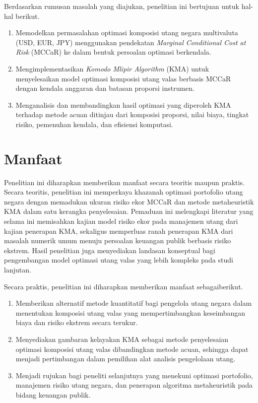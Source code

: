 Berdasarkan rumusan masalah yang diajukan, penelitian ini bertujuan untuk hal-hal berikut.
\begin{enumerate}
  \item Memodelkan permasalahan optimasi komposisi utang negara multivaluta (USD, EUR, JPY) menggunakan pendekatan \textit{Marginal Conditional Cost at Risk} (MCCaR) ke dalam bentuk persoalan optimasi berkendala.
  \item Mengimplementasikan \textit{Komodo Mlipir Algorithm} (KMA) untuk menyelesaikan model optimasi komposisi utang valas berbasis MCCaR dengan kendala anggaran dan batasan proporsi instrumen.
  \item Menganalisis dan membandingkan hasil optimasi yang diperoleh KMA terhadap metode acuan ditinjau dari komposisi proporsi, nilai biaya, tingkat risiko, pemenuhan kendala, dan efisiensi komputasi.
\end{enumerate}


\section{Manfaat}
\label{sec:manfaat}

Penelitian ini diharapkan memberikan manfaat secara teoritis maupun praktis. Secara teoritis, penelitian ini memperkaya khazanah optimasi portofolio utang negara dengan memadukan ukuran risiko ekor MCCaR dan metode metaheuristik KMA dalam satu kerangka penyelesaian. Pemaduan ini melengkapi literatur yang selama ini memisahkan kajian model risiko ekor pada manajemen utang dari kajian penerapan KMA, sekaligus memperluas ranah penerapan KMA dari masalah numerik umum menuju persoalan keuangan publik berbasis risiko ekstrem. Hasil penelitian juga menyediakan landasan konseptual bagi pengembangan model optimasi utang valas yang lebih kompleks pada studi lanjutan.

Secara praktis, penelitian ini diharapkan memberikan manfaat sebagaiberikut.
\begin{enumerate}
  \item Memberikan alternatif metode kuantitatif bagi pengelola utang negara dalam menentukan komposisi utang valas yang mempertimbangkan keseimbangan biaya dan risiko ekstrem secara terukur.
  \item Menyediakan gambaran kelayakan KMA sebagai metode penyelesaian optimasi komposisi utang valas dibandingkan metode acuan, sehingga dapat menjadi pertimbangan dalam pemilihan alat analisis pengelolaan utang.
  \item Menjadi rujukan bagi peneliti selanjutnya yang menekuni optimasi portofolio, manajemen risiko utang negara, dan penerapan algoritma metaheuristik pada bidang keuangan publik.
\end{enumerate}
